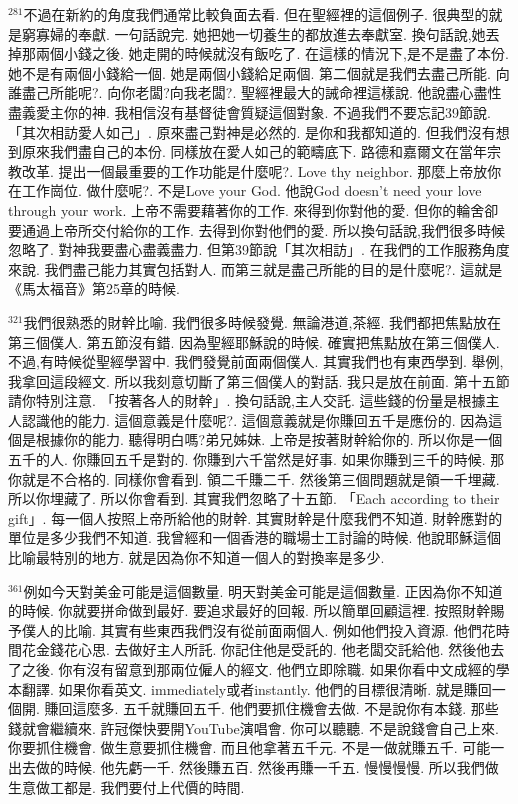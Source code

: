 \documentclass{book}
\begin{document}
$^{281}$不過在新約的角度我們通常比較負面去看.
但在聖經裡的這個例子.
很典型的就是窮寡婦的奉獻.
一句話說完.
她把她一切養生的都放進去奉獻室.
換句話說,她丟掉那兩個小錢之後.
她走開的時候就沒有飯吃了.
在這樣的情況下,是不是盡了本份.
她不是有兩個小錢給一個.
她是兩個小錢給足兩個.
第二個就是我們去盡己所能.
向誰盡己所能呢?.
向你老闆?向我老闆?.
聖經裡最大的誡命裡這樣說.
他說盡心盡性盡義愛主你的神.
我相信沒有基督徒會質疑這個對象.
不過我們不要忘記39節說.
「其次相訪愛人如己」.
原來盡己對神是必然的.
是你和我都知道的.
但我們沒有想到原來我們盡自己的本份.
同樣放在愛人如己的範疇底下.
路德和嘉爾文在當年宗教改革.
提出一個最重要的工作功能是什麼呢?.
Love thy neighbor.
那麼上帝放你在工作崗位.
做什麼呢?.
不是Love your God.
他說God doesn't need your love through your work.
上帝不需要藉著你的工作.
來得到你對他的愛.
但你的輪舍卻要通過上帝所交付給你的工作.
去得到你對他們的愛.
所以換句話說,我們很多時候忽略了.
對神我要盡心盡義盡力.
但第39節說「其次相訪」.
在我們的工作服務角度來說.
我們盡己能力其實包括對人.
而第三就是盡己所能的目的是什麼呢?.
這就是《馬太福音》第25章的時候.

$^{321}$我們很熟悉的財幹比喻.
我們很多時候發覺.
無論港道,茶經.
我們都把焦點放在第三個僕人.
第五節沒有錯.
因為聖經耶穌說的時候.
確實把焦點放在第三個僕人.
不過,有時候從聖經學習中.
我們發覺前面兩個僕人.
其實我們也有東西學到.
舉例,我拿回這段經文.
所以我刻意切斷了第三個僕人的對話.
我只是放在前面.
第十五節請你特別注意.
「按著各人的財幹」.
換句話說,主人交託.
這些錢的份量是根據主人認識他的能力.
這個意義是什麼呢?.
這個意義就是你賺回五千是應份的.
因為這個是根據你的能力.
聽得明白嗎?弟兄姊妹.
上帝是按著財幹給你的.
所以你是一個五千的人.
你賺回五千是對的.
你賺到六千當然是好事.
如果你賺到三千的時候.
那你就是不合格的.
同樣你會看到.
領二千賺二千.
然後第三個問題就是領一千埋藏.
所以你埋藏了.
所以你會看到.
其實我們忽略了十五節.
「Each according to their gift」.
每一個人按照上帝所給他的財幹.
其實財幹是什麼我們不知道.
財幹應對的單位是多少我們不知道.
我曾經和一個香港的職場士工討論的時候.
他說耶穌這個比喻最特別的地方.
就是因為你不知道一個人的對換率是多少.

$^{361}$例如今天對美金可能是這個數量.
明天對美金可能是這個數量.
正因為你不知道的時候.
你就要拼命做到最好.
要追求最好的回報.
所以簡單回顧這裡.
按照財幹賜予僕人的比喻.
其實有些東西我們沒有從前面兩個人.
例如他們投入資源.
他們花時間花金錢花心思.
去做好主人所託.
你記住他是受託的.
他老闆交託給他.
然後他去了之後.
你有沒有留意到那兩位僱人的經文.
他們立即除職.
如果你看中文成經的學本翻譯.
如果你看英文.
immediately或者instantly.
他們的目標很清晰.
就是賺回一個開.
賺回這麼多.
五千就賺回五千.
他們要抓住機會去做.
不是說你有本錢.
那些錢就會繼續來.
許冠傑快要開YouTube演唱會.
你可以聽聽.
不是說錢會自己上來.
你要抓住機會.
做生意要抓住機會.
而且他拿著五千元.
不是一做就賺五千.
可能一出去做的時候.
他先虧一千.
然後賺五百.
然後再賺一千五.
慢慢慢慢.
所以我們做生意做工都是.
我們要付上代價的時間.
\end{document}
